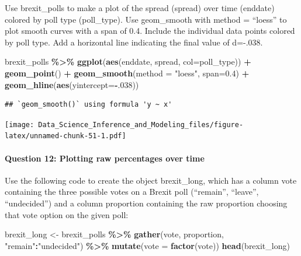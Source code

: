 \documentclass[
]{article}
\newenvironment{Shaded}{\begin{snugshade}}{\end{snugshade}}
\newcommand{\DataTypeTok}[1]{\textcolor[rgb]{0.13,0.29,0.53}{#1}}
\newcommand{\DecValTok}[1]{\textcolor[rgb]{0.00,0.00,0.81}{#1}}
\newcommand{\FloatTok}[1]{\textcolor[rgb]{0.00,0.00,0.81}{#1}}
\newcommand{\KeywordTok}[1]{\textcolor[rgb]{0.13,0.29,0.53}{\textbf{#1}}}
\newcommand{\NormalTok}[1]{#1}
\newcommand{\OperatorTok}[1]{\textcolor[rgb]{0.81,0.36,0.00}{\textbf{#1}}}
\newcommand{\StringTok}[1]{\textcolor[rgb]{0.31,0.60,0.02}{#1}}
\begin{document}
Use brexit\_polls to make a plot of the spread (spread) over time
(enddate) colored by poll type (poll\_type). Use geom\_smooth with
method = ``loess'' to plot smooth curves with a span of 0.4. Include the
individual data points colored by poll type. Add a horizontal line
indicating the final value of d=-.038.

\begin{Shaded}
\begin{Highlighting}[]
\NormalTok{brexit\_polls }\OperatorTok{\%\textgreater{}\%}
\StringTok{  }\KeywordTok{ggplot}\NormalTok{(}\KeywordTok{aes}\NormalTok{(enddate, spread, }\DataTypeTok{col=}\NormalTok{poll\_type)) }\OperatorTok{+}
\StringTok{  }\KeywordTok{geom\_point}\NormalTok{() }\OperatorTok{+}
\StringTok{  }\KeywordTok{geom\_smooth}\NormalTok{(}\DataTypeTok{method =} \StringTok{"loess"}\NormalTok{, }\DataTypeTok{span=}\FloatTok{0.4}\NormalTok{) }\OperatorTok{+}
\StringTok{  }\KeywordTok{geom\_hline}\NormalTok{(}\KeywordTok{aes}\NormalTok{(}\DataTypeTok{yintercept=}\OperatorTok{{-}}\NormalTok{.}\DecValTok{038}\NormalTok{))}
\end{Highlighting}
\end{Shaded}

\begin{verbatim}
## `geom_smooth()` using formula 'y ~ x'
\end{verbatim}

\texttt{[image: Data\_Science\_Inference\_and\_Modeling\_files/figure-latex/unnamed-chunk-51-1.pdf]}

\hypertarget{question-12-plotting-raw-percentages-over-time}{%
\paragraph{Question 12: Plotting raw percentages over
time}\label{question-12-plotting-raw-percentages-over-time}}

Use the following code to create the object brexit\_long, which has a
column vote containing the three possible votes on a Brexit poll
(``remain'', ``leave'', ``undecided'') and a column proportion
containing the raw proportion choosing that vote option on the given
poll:

\begin{Shaded}
\begin{Highlighting}[]
\NormalTok{brexit\_long \textless{}{-}}\StringTok{ }\NormalTok{brexit\_polls }\OperatorTok{\%\textgreater{}\%}
\StringTok{    }\KeywordTok{gather}\NormalTok{(vote, proportion, }\StringTok{"remain"}\OperatorTok{:}\StringTok{"undecided"}\NormalTok{) }\OperatorTok{\%\textgreater{}\%}
\StringTok{    }\KeywordTok{mutate}\NormalTok{(}\DataTypeTok{vote =} \KeywordTok{factor}\NormalTok{(vote))}
\KeywordTok{head}\NormalTok{(brexit\_long)}
\end{Highlighting}
\end{Shaded}
\end{document}
